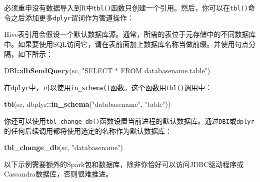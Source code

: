 \documentclass[
]{article}
\newenvironment{Shaded}{\begin{snugshade}}{\end{snugshade}}
\newcommand{\DataTypeTok}[1]{\textcolor[rgb]{0.13,0.29,0.53}{#1}}
\newcommand{\KeywordTok}[1]{\textcolor[rgb]{0.13,0.29,0.53}{\textbf{#1}}}
\newcommand{\NormalTok}[1]{#1}
\newcommand{\OperatorTok}[1]{\textcolor[rgb]{0.81,0.36,0.00}{\textbf{#1}}}
\newcommand{\StringTok}[1]{\textcolor[rgb]{0.31,0.60,0.02}{#1}}
\begin{document}
必须重申没有数据导入到R中\texttt{tbl()}函数只创建一个引用。然后，你可以在\texttt{tbl()}命令之后添加更多\texttt{dplyr}谓词作为管道操作：

\begin{Shaded}
\end{Shaded}

Hive表引用会假设一个默认数据库源。通常，所需的表位于元存储中的不同数据库中。如果要使用SQL访问它，请在表前面加上数据库名称当做前缀。并使用句点分隔，如下所示：

\begin{Shaded}
\begin{Highlighting}[]
\NormalTok{DBI}\OperatorTok{::}\KeywordTok{dbSendQuery}\NormalTok{(sc, }\StringTok{"SELECT * FROM databasename.table"}\NormalTok{)}
\end{Highlighting}
\end{Shaded}

在\texttt{dplyr}中，可以使用\texttt{in\_schema()}函数。这个函数用\texttt{tbl()}调用中：

\begin{Shaded}
\begin{Highlighting}[]
\KeywordTok{tbl}\NormalTok{(sc, dbplyr}\OperatorTok{::}\KeywordTok{in_schema}\NormalTok{(}\StringTok{"databasename"}\NormalTok{, }\StringTok{"table"}\NormalTok{))}
\end{Highlighting}
\end{Shaded}

你还可以使用\texttt{tbl\_change\_db()}函数设置当前进程的默认数据库。通过\texttt{DBI}或\texttt{dplyr}的任何后续调用都将使用选定的名称作为默认数据库：

\begin{Shaded}
\begin{Highlighting}[]
\KeywordTok{tbl_change_db}\NormalTok{(sc, }\StringTok{"databasename"}\NormalTok{)}
\end{Highlighting}
\end{Shaded}

以下示例需要额外的Spark包和数据库，除非你恰好可以访问JDBC驱动程序或Cassandra数据库，否则很难推进。
\end{document}
